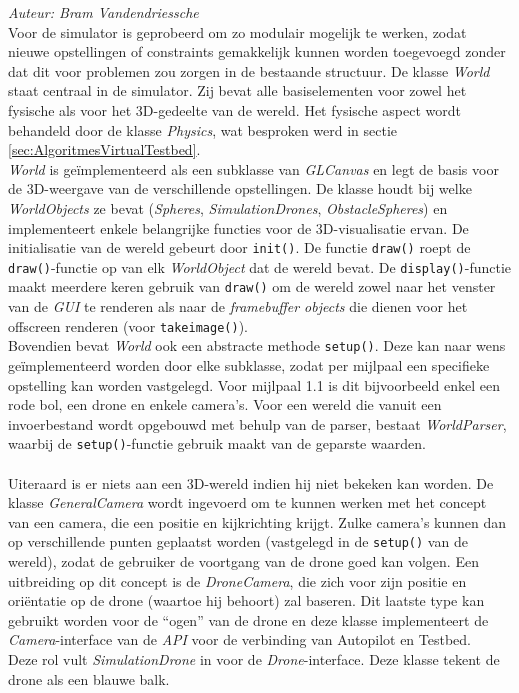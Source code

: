 {\em Auteur: Bram Vandendriessche}
\\

\noindent
Voor de simulator is geprobeerd om zo modulair mogelijk te werken, zodat nieuwe opstellingen of constraints gemakkelijk kunnen worden toegevoegd zonder dat dit voor problemen zou zorgen in de bestaande structuur. De klasse \textit{World} staat centraal in de simulator. Zij bevat alle basiselementen voor zowel het fysische als voor het 3D-gedeelte van de wereld. Het fysische aspect wordt behandeld door de klasse \textit{Physics}, wat besproken werd in sectie \ref{sec:AlgoritmesVirtualTestbed}. 
\\

\noindent
\textit{World} is ge\"implementeerd als een subklasse van \textit{GLCanvas} en legt de basis voor de 3D-weergave van de verschillende opstellingen. 
De klasse houdt bij welke \textit{WorldObjects} ze bevat (\textit{Spheres}, \textit{SimulationDrones}, \textit{ObstacleSpheres}) en implementeert enkele belangrijke functies voor de 3D-visualisatie ervan. De initialisatie van de wereld gebeurt door \texttt{init()}. De functie \texttt{draw()} roept de \texttt{draw()}-functie op van elk \textit{WorldObject} dat de wereld bevat. De \texttt{display()}-functie maakt meerdere keren gebruik van \texttt{draw()} om de wereld zowel naar het venster van de \textit{GUI} te renderen als naar de \textit{framebuffer objects} die dienen voor het offscreen renderen (voor \texttt{takeimage()}).\\
Bovendien bevat \textit{World} ook een abstracte methode \texttt{setup()}. Deze kan naar wens ge\"implementeerd worden door elke subklasse, zodat per mijlpaal een specifieke opstelling kan worden vastgelegd. Voor mijlpaal 1.1 is dit bijvoorbeeld enkel een rode bol, een drone en enkele camera's. Voor een wereld die vanuit een invoerbestand wordt opgebouwd met behulp van de parser, bestaat \textit{WorldParser}, waarbij de \texttt{setup()}-functie gebruik maakt van de geparste waarden.\\
\\
Uiteraard is er niets aan een 3D-wereld indien hij niet bekeken kan worden. De klasse \textit{GeneralCamera} wordt ingevoerd om te kunnen werken met het concept van een camera, die een positie en kijkrichting krijgt. Zulke camera's kunnen dan op verschillende punten geplaatst worden (vastgelegd in de \texttt{setup()} van de wereld), zodat de gebruiker de voortgang van de drone goed kan volgen. Een uitbreiding op dit concept is de \textit{DroneCamera}, die zich voor zijn positie en ori\"entatie op de drone (waartoe hij behoort) zal baseren. Dit laatste type kan gebruikt worden voor de ``ogen'' van de drone en deze klasse implementeert de \textit{Camera}-interface van de \textit{API} voor de verbinding van Autopilot en Testbed.\\
Deze rol vult \textit{SimulationDrone} in voor de \textit{Drone}-interface. Deze klasse tekent de drone als een blauwe balk.

